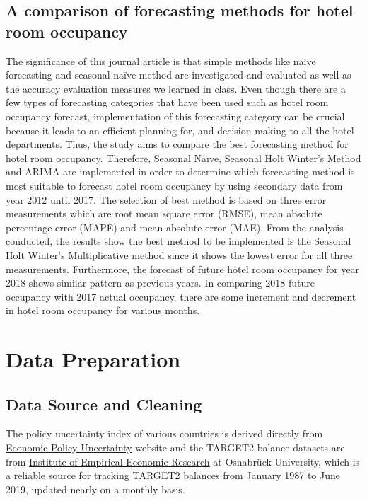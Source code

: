 \documentclass[12pt]{article}
\begin{document}
\subsection{A comparison of forecasting methods for hotel room occupancy}
The significance of this journal article is that simple methods like naïve forecasting and seasonal naïve method are investigated and evaluated as well as the accuracy evaluation measures we learned in class. Even though there are a few types of forecasting categories that have been used such as hotel room occupancy forecast, implementation of this forecasting category can be crucial because it leads to an efficient planning for, and decision making to all the hotel departments. Thus, the study aims to compare the best forecasting method for hotel room occupancy. Therefore, Seasonal Naïve, Seasonal Holt Winter’s Method and ARIMA are implemented in order to determine which forecasting method is most suitable to forecast hotel room occupancy by using secondary data from year 2012 until 2017. The selection of best method is based on three error measurements which are root mean square error (RMSE), mean absolute percentage error (MAPE) and mean absolute error (MAE). From the analysis conducted, the results show the best method to be implemented is the Seasonal Holt Winter’s Multiplicative method since it shows the lowest error for all three measurements. Furthermore, the forecast of future hotel room occupancy for year 2018 shows similar pattern as previous years. In comparing 2018 future occupancy with 2017 actual occupancy, there are some increment and decrement in hotel room occupancy for various months.

\section{Data Preparation} \label{sec:prepare}
\subsection{Data Source and Cleaning}
The policy uncertainty index of various countries is derived directly from \href{https://www.policyuncertainty.com/monetary.html}{\underline{Economic Policy Uncertainty}} website and the TARGET2 balance datasets are from \href{http://www.eurocrisismonitor.com}{\underline{Institute of Empirical Economic Research}} at Osnabrück University, which is a reliable source for tracking TARGET2 balances from January 1987 to June 2019, updated nearly on a monthly basis. 
\end{document}
